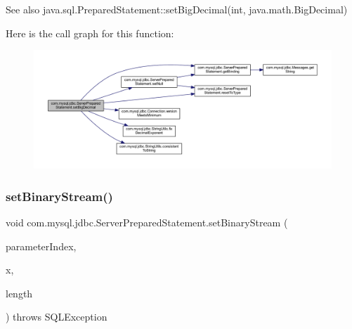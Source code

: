 \begin{DoxySeeAlso}{See also}
java.\+sql.\+Prepared\+Statement\+::set\+Big\+Decimal(int, java.\+math.\+Big\+Decimal) 
\end{DoxySeeAlso}
Here is the call graph for this function\+:
\nopagebreak
\begin{figure}[H]
\begin{center}
\leavevmode
\includegraphics[width=350pt]{classcom_1_1mysql_1_1jdbc_1_1_server_prepared_statement_a4ebc09b4d7c11864da98aaa889cdaa93_cgraph}
\end{center}
\end{figure}
\mbox{\label{classcom_1_1mysql_1_1jdbc_1_1_server_prepared_statement_a7b5f9403670d9b795ba1a1e269d3ef2a}} 
\subsubsection{\texorpdfstring{set\+Binary\+Stream()}{setBinaryStream()}}
{\footnotesize\ttfamily void com.\+mysql.\+jdbc.\+Server\+Prepared\+Statement.\+set\+Binary\+Stream (\begin{DoxyParamCaption}\item[{int}]{parameter\+Index,  }\item[{Input\+Stream}]{x,  }\item[{int}]{length }\end{DoxyParamCaption}) throws S\+Q\+L\+Exception}

